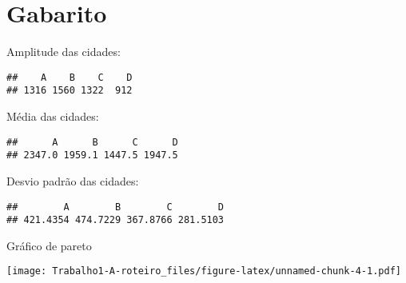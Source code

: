 \documentclass[]{article}
\begin{document}
\section{Gabarito}\label{gabarito}

Amplitude das cidades:

\begin{verbatim}
##    A    B    C    D 
## 1316 1560 1322  912
\end{verbatim}

Média das cidades:

\begin{verbatim}
##      A      B      C      D 
## 2347.0 1959.1 1447.5 1947.5
\end{verbatim}

Desvio padrão das cidades:

\begin{verbatim}
##        A        B        C        D 
## 421.4354 474.7229 367.8766 281.5103
\end{verbatim}

Gráfico de pareto

\texttt{[image: Trabalho1-A-roteiro\_files/figure-latex/unnamed-chunk-4-1.pdf]}\\
\end{document}
